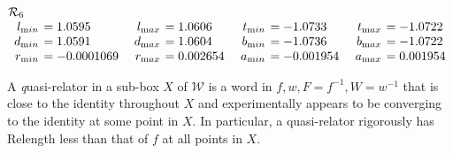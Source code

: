 \begin{table}
\begin{small}
$$\begin{array}{rlrlrlrl}
\noalign{\noindent  ${\mathcal R}_6$}
\noalign{\vskip2pt}
l_{\textrm min} &\hskip-6pt =  1.0595&\enspace    l_{\textrm max} &\hskip-6pt =  1.0606&\enspace   
t_{\textrm min} &\hskip-6pt =  -1.0733&\enspace    t_{\textrm max} &\hskip-6pt =  -1.0722\\
d_{\textrm min} &\hskip-6pt =  1.0591&  d_{\textrm max}
&\hskip-6pt =  1.0604&   b_{\textrm min} &\hskip-6pt =  -1.0736&  b_{\textrm max} &\hskip-6pt =  -1.0722\\
r_{\textrm min} &\hskip-6pt =  -0.0001069& 
r_{\textrm max} &\hskip-6pt =  0.002654&   a_{\textrm min} &\hskip-6pt =  -0.001954&  a_{\textrm max} &\hskip-6pt =  0.001954\end{array}$$
\end{small}
\end{table}

\begin{definition} \label{GMT 1.27} A {\textit quasi-relator} in a sub-box $X$ of ${\mathcal W}$ is a word in $f,w,F=f^{-1},W=w^{-1}$ that is close to the identity
throughout
$X$ and experimentally appears to be converging to the identity at some point in $X.$  In particular, a quasi-relator rigorously has Relength less than
that of $f$ at all points in $X.$
\end{definition}

